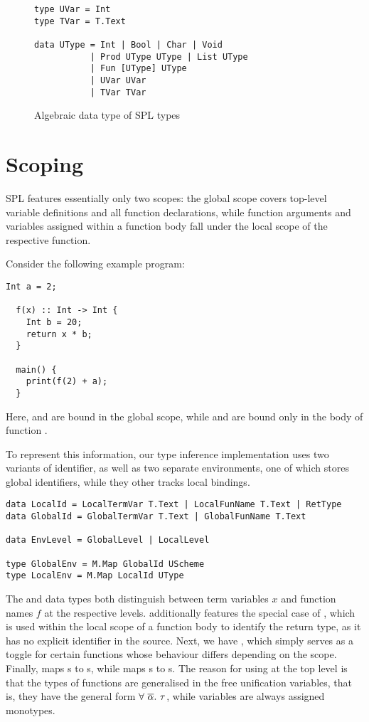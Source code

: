 \begin{figure}
\begin{verbatim}
type UVar = Int
type TVar = T.Text

data UType = Int | Bool | Char | Void
           | Prod UType UType | List UType
           | Fun [UType] UType
           | UVar UVar
           | TVar TVar
\end{verbatim}

  \caption{Algebraic data type of SPL types}
  \label{fig:type-adt}
\end{figure}


\section{Scoping}
SPL features essentially only two scopes: the global scope covers top-level
variable definitions and all function declarations, while function arguments
and variables assigned within a function body fall under the local scope of the
respective function.

Consider the following example program:
%
\begin{lstlisting}[language=SPL]
  Int a = 2;

  f(x) :: Int -> Int {
    Int b = 20;
    return x * b;
  }

  main() {
    print(f(2) + a);
  }
\end{lstlisting}
%
Here,  and  are bound in the global scope, while  and
 are bound only in the body of function .

To represent this information, our type inference implementation uses two
variants of identifier, as well as two separate environments, one of which
stores global identifiers, while they other tracks local bindings.

\begin{verbatim}
data LocalId = LocalTermVar T.Text | LocalFunName T.Text | RetType
data GlobalId = GlobalTermVar T.Text | GlobalFunName T.Text

data EnvLevel = GlobalLevel | LocalLevel

type GlobalEnv = M.Map GlobalId UScheme
type LocalEnv = M.Map LocalId UType
\end{verbatim}

The  and  data types both distinguish between
term variables $x$ and function names $f$ at the respective levels.
 additionally features the special case of ,
which is used within the local scope of a function body to identify the return
type, as it has no explicit identifier in the source.
Next, we have , which simply serves as a toggle for certain
functions whose behaviour differs depending on the scope.
Finally,  maps s to s,
while  maps s to s.
The reason for using  at the top level is that the types of
functions are generalised in the free unification variables, that is, they have
the general form $\forall\ \set{\alpha}.\ \tau$, while variables are always
assigned monotypes.


